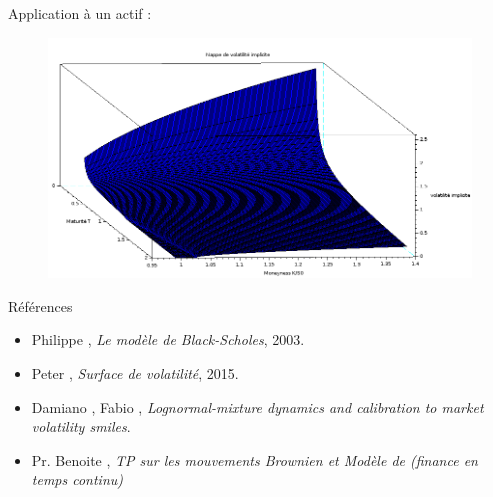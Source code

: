 \documentclass[final]{beamer}
\newlength{\onecolwid}
\begin{document}
\begin{frame}[t]
\begin{columns}[t]
\begin{column}{\onecolwid}
\begin{block}{Application à un actif :}
  \begin{minipage}{1.49\textwidth}
    \begin{figure}
      \vspace{-8.5cm}
      \includegraphics[scale=0.55]{volimpl2.png}
    \end{figure}
  \end{minipage}
\end{block}



\begin{block}{Références}

  \begin{minipage}{0.6\textwidth}
    \begin{itemize}
      \small
        \item Philippe ,  \textit{Le modèle de Black-Scholes}, 2003.
        \item Peter , \textit{Surface de volatilité}, 2015.
        \item Damiano , Fabio , \textit{Lognormal-mixture dynamics and calibration to market volatility smiles}.
        \item Pr. Benoite , \textit{TP sur les mouvements Brownien et Modèle de  (finance en temps continu)}
    \end{itemize}
    \end{minipage}


\end{block}
\end{column}
\end{columns}
\end{frame}
\end{document}

